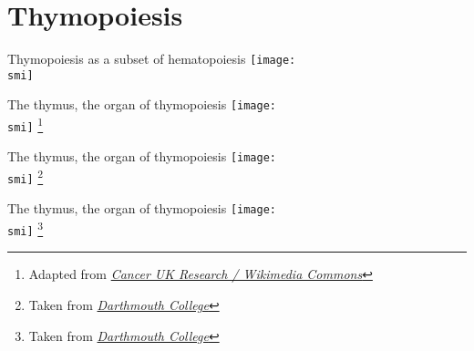\documentclass[10pt, usenames, dvipsnames]{beamer}
\def\smi{out/ln/updir/mw-gcthesis-oral/library.bib}
\newcommand\blfootnote[1]{%
  \begingroup
  \renewcommand\thefootnote{}\footnote{#1}%
  \addtocounter{footnote}{-1}%
  \endgroup
  }
\begin{document}
  \section{Thymopoiesis}
  \begin{frame}{Thymopoiesis as a subset of hematopoiesis}
  \def\smi{out/ln/updir/mw-gcthesis-oral/ink/Ulirsch2019-fig1-recolored-thymopoiesis-highlighted.pdf}
  \texttt{[image: \\smi]}%
\end{frame}
\begin{frame}{The thymus, the organ of thymopoiesis}
  \def\smi{out/ln/updir/mw-gcthesis-oral/ink/thymus/1.pdf}
  \texttt{[image: \\smi]}%
  \blfootnote{Adapted from \textit{\href{https://commons.wikimedia.org/wiki/File:Diagram_showing_the_position_of_the_thymus_gland_CRUK_362.svg}{Cancer UK Research / Wikimedia Commons}}}
\end{frame}
\begin{frame}{The thymus, the organ of thymopoiesis}
  \def\smi{out/ln/updir/mw-gcthesis-oral/ink/thymus/2.pdf}
  \texttt{[image: \\smi]}%
  \blfootnote{Taken from \textit{\href{https://www.dartmouth.edu/~anatomy/Histo/lab_6/lymphoid/DMS117/popup.html}{Darthmouth College}}}
\end{frame}
\begin{frame}{The thymus, the organ of thymopoiesis}
  \def\smi{out/ln/updir/mw-gcthesis-oral/ink/thymus/3.pdf}
  \texttt{[image: \\smi]}%
  \blfootnote{Taken from \textit{\href{https://www.dartmouth.edu/~anatomy/Histo/lab_6/lymphoid/DMS117/popup.html}{Darthmouth College}}}
\end{frame}
\end{document}
